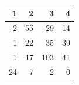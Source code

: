 \begin{tabular}{rrrr}
\toprule
1 & 2 & 3 & 4 \\
\midrule
2 & 55 & 29 & 14 \\
1 & 22 & 35 & 39 \\
1 & 17 & 103 & 41 \\
24 & 7 & 2 & 0 \\
\bottomrule
\end{tabular}
